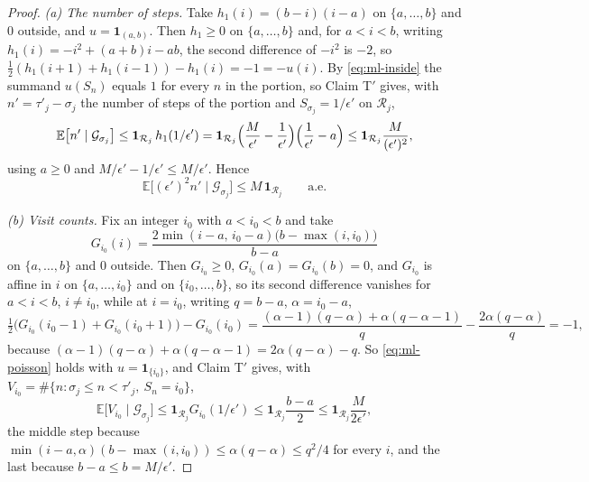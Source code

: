 \begin{proof}
\emph{(a) The number of steps.} Take $h_1(i)=(b-i)(i-a)$ on
$\{a,\dots,b\}$ and $0$ outside, and $u=\mathbf1_{(a,b)}$. Then $h_1\ge0$ on
$\{a,\dots,b\}$ and, for $a<i<b$, writing $h_1(i)=-i^2+(a+b)i-ab$, the second
difference of $-i^2$ is $-2$, so
$\tfrac12(h_1(i+1)+h_1(i-1))-h_1(i)=-1=-u(i)$. By \eqref{eq:ml-inside} the
summand $u(S_n)$ equals $1$ for every $n$ in the portion, so Claim T$'$ gives,
with $n'=\tau'_j-\sigma_j$ the number of steps of the portion and
$S_{\sigma_j}=1/\epsilon'$ on $\mathcal R_j$,
\[
  \mathbb E\bigl[n'\mid\mathcal G_{\sigma_j}\bigr]
   \le\mathbf1_{\mathcal R_j}\,h_1(1/\epsilon')
   =\mathbf1_{\mathcal R_j}\Bigl(\frac{M}{\epsilon'}-\frac1{\epsilon'}\Bigr)
      \Bigl(\frac1{\epsilon'}-a\Bigr)
   \le\mathbf1_{\mathcal R_j}\frac{M}{(\epsilon')^2},
\]
using $a\ge0$ and $M/\epsilon'-1/\epsilon'\le M/\epsilon'$. Hence
\begin{equation}\label{eq:ml-time-budget}
  \mathbb E\bigl[(\epsilon')^2n'\mid\mathcal G_{\sigma_j}\bigr]
   \le M\,\mathbf1_{\mathcal R_j}\qquad\text{a.e.}
\end{equation}

\emph{(b) Visit counts.} Fix an integer $i_0$ with $a<i_0<b$ and take
\[
  G_{i_0}(i)=\frac{2\min(i-a,\,i_0-a)\bigl(b-\max(i,i_0)\bigr)}{b-a}
\]
on $\{a,\dots,b\}$ and $0$ outside. Then $G_{i_0}\ge0$,
$G_{i_0}(a)=G_{i_0}(b)=0$, and $G_{i_0}$ is affine in $i$ on
$\{a,\dots,i_0\}$ and on $\{i_0,\dots,b\}$, so its second difference vanishes
for $a<i<b$, $i\ne i_0$, while at $i=i_0$, writing $q=b-a$,
$\alpha=i_0-a$,
\[
  \tfrac12\bigl(G_{i_0}(i_0-1)+G_{i_0}(i_0+1)\bigr)-G_{i_0}(i_0)
   =\frac{(\alpha-1)(q-\alpha)+\alpha(q-\alpha-1)}{q}
      -\frac{2\alpha(q-\alpha)}{q}=-1,
\]
because $(\alpha-1)(q-\alpha)+\alpha(q-\alpha-1)=2\alpha(q-\alpha)-q$. So
\eqref{eq:ml-poisson} holds with $u=\mathbf1_{\{i_0\}}$, and Claim T$'$ gives,
with $V_{i_0}=\#\{n:\sigma_j\le n<\tau'_j,\ S_n=i_0\}$,
\begin{equation}\label{eq:ml-visits}
  \mathbb E\bigl[V_{i_0}\mid\mathcal G_{\sigma_j}\bigr]
   \le\mathbf1_{\mathcal R_j}G_{i_0}(1/\epsilon')
   \le\mathbf1_{\mathcal R_j}\frac{b-a}{2}
   \le\mathbf1_{\mathcal R_j}\frac{M}{2\epsilon'},
\end{equation}
the middle step because $\min(i-a,\alpha)(b-\max(i,i_0))\le\alpha(q-\alpha)\le
q^2/4$ for every $i$, and the last because $b-a\le b=M/\epsilon'$.


\end{proof}
